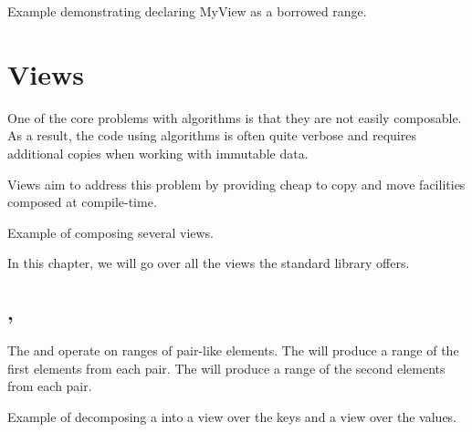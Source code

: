 \begin{box-note}
\footnotesize Example demonstrating declaring MyView as a borrowed range.
\tcblower
{}
\end{box-note}

\section{Views}

One of the core problems with algorithms is that they are not easily composable. As a result, the code using algorithms is often quite verbose and requires additional copies when working with immutable data.

Views aim to address this problem by providing cheap to copy and move facilities composed at compile-time.

\begin{box-note}
\footnotesize Example of composing several views.
\tcblower
{}
\end{box-note}

In this chapter, we will go over all the views the standard library offers.


\subsection{\texorpdfstring{, }{\texttt{std::views::keys}, \texttt{std::views::values}}}

The  and  operate on ranges of pair-like elements.
The  will produce a range of the first elements from each pair.
The  will produce a range of the second elements from each pair.

\begin{box-note}
\footnotesize Example of decomposing a  into a view over the keys and a view over the values.
\tcblower
{}
\end{box-note}

\subsection{\texorpdfstring{}{\texttt{std::views::elements}}}

